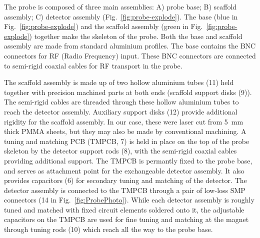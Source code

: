 \documentclass[preprint,5p]{elsarticle}
\newcommand{\fig}[1]{Fig.~\ref{#1}}
\begin{document}
The probe is composed of three main assemblies: A) probe base; B) scaffold assembly;
C) detector assembly (\fig{fig:probe-explode}).
The  base (blue in \fig{fig:probe-explode}) and the scaffold assembly
(green in \fig{fig:probe-explode}) together make the skeleton of the probe.
Both the base and scaffold assembly are made from standard aluminium profiles.
The base contains the BNC connectors for RF (Radio Frequency) input.
These BNC connectors are connected to semi-rigid coaxial cables for
RF transport in the probe.

The scaffold assembly is made up of two hollow aluminium tubes (11) held together with
precision machined parts at both ends (scaffold support disks (9)).
The semi-rigid cables are  threaded through these hollow aluminium tubes
to reach the detector assembly.
Auxiliary support disks (12) provide additional rigidity for the scaffold assembly.
In our case, these were laser cut from 5~mm thick PMMA sheets,
but they may also be made by conventional machining.
A tuning and matching PCB (TMPCB, 7) is held in place on the top of the probe skeleton by
the detector support rods (8), with the semi-rigid coaxial cables providing
additional support.
The TMPCB is permantly fixed to the probe base, and serves as attachment point
for the exchangeable detector assembly. It also provides
capacitors (6) for secondary tuning and matching of the detector.
The detector assembly is connected to the TMPCB through a pair of
low-loss SMP connectors (14 in \fig{fig:ProbePhoto}).
While each detector assembly is roughly
tuned and matched with fixed circuit elements soldered onto it,
the adjustable capacitors on the TMPCB are used for
fine tuning and matching
at the magnet through tuning rods (10) which reach all the way to the probe base.
\end{document}
